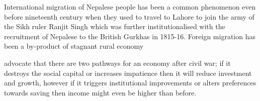 


International migration of Nepalese people has been a common phenomenon even before nineteenth century when they used to travel to Lahore to join the army of the Sikh ruler Ranjit Singh which was further institutionalised with the recruitment of Nepalese to the British Gurkhas in 1815-16. \cite{Seddon2002} Foreign migration has been a by-product of stagnant rural economy 

\cite{Voors2012} advocate that there are two pathways for an economy after civil war; if it destroys the social capital or increases impatience then it will reduce investment and growth, however if it triggers institutional improvements or alters preferences towards saving then income might even be higher than before. 
